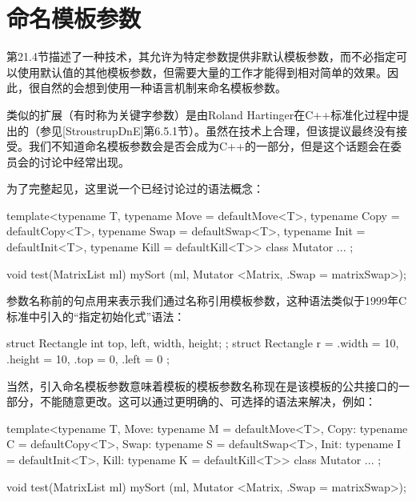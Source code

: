\section{命名模板参数}
第21.4节描述了一种技术，其允许为特定参数提供非默认模板参数，而不必指定可以使用默认值的其他模板参数，但需要大量的工作才能得到相对简单的效果。因此，很自然的会想到使用一种语言机制来命名模板参数。

类似的扩展（有时称为关键字参数）是由Roland Hartinger在C++标准化过程中提出的（参见[StroustrupDnE]第6.5.1节）。虽然在技术上合理，但该提议最终没有接受。我们不知道命名模板参数会是否会成为C++的一部分，但是这个话题会在委员会的讨论中经常出现。

为了完整起见，这里说一个已经讨论过的语法概念：

\begin{cpp}
template<typename T,
	typename Move = defaultMove<T>,
	typename Copy = defaultCopy<T>,
	typename Swap = defaultSwap<T>,
	typename Init = defaultInit<T>,
	typename Kill = defaultKill<T>>
class Mutator {
	...
};

void test(MatrixList ml) {
	mySort (ml, Mutator <Matrix, .Swap = matrixSwap>);
}
\end{cpp}

参数名称前的句点用来表示我们通过名称引用模板参数，这种语法类似于1999年C标准中引入的“指定初始化式”语法：

\begin{cpp}
struct Rectangle { int top, left, width, height; };
struct Rectangle r = { .width = 10, .height = 10, .top = 0, .left = 0 };
\end{cpp}

当然，引入命名模板参数意味着模板的模板参数名称现在是该模板的公共接口的一部分，不能随意更改。这可以通过更明确的、可选择的语法来解决，例如：

\begin{cpp}
template<typename T,
	Move: typename M = defaultMove<T>,
	Copy: typename C = defaultCopy<T>,
	Swap: typename S = defaultSwap<T>,
	Init: typename I = defaultInit<T>,
	Kill: typename K = defaultKill<T>>
class Mutator {
	...
};

void test(MatrixList ml) {
	mySort (ml, Mutator <Matrix, .Swap = matrixSwap>);
}
\end{cpp}









































